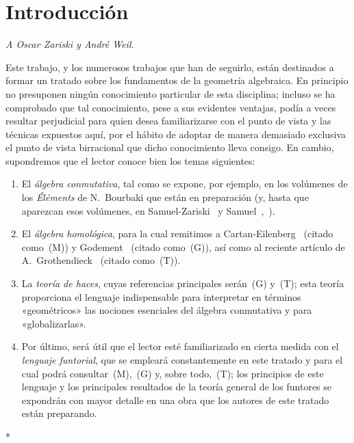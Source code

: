 \section*{Introducción}

\begin{center}
\emph{A Oscar Zariski y André Weil.}
\end{center}


Este trabajo, y los numerosos trabajos que han de seguirlo, están destinados a formar un tratado sobre los fundamentos de la geometría algebraica.
En principio no presuponen ningún conocimiento particular de esta disciplina; incluso se ha comprobado que tal conocimiento, pese a sus evidentes ventajas, podía a veces resultar perjudicial para quien desea familiarizarse con el punto de vista y las técnicas expuestos aquí, por el hábito de adoptar de manera demasiado exclusiva el punto de vista birracional que dicho conocimiento lleva consigo.
En cambio, supondremos que el lector conoce bien los temas siguientes:

\begin{enumerate}
  \item[a)] El \emph{álgebra conmutativa}, tal como se expone, por ejemplo, en los volúmenes de los \emph{Éléments} de N.~Bourbaki que están en preparación (y, hasta que aparezcan esos volúmenes, en Samuel-Zariski~\cite{I-13} y Samuel~\cite{I-11},~\cite{I-12}).
  \item[b)] El \emph{álgebra homológica}, para la cual remitimos a Cartan-Eilenberg~\cite{I-2} (citado como~(M)) y Godement~\cite{I-4} (citado como~(G)), así como al reciente artículo de A.~Grothendieck~\cite{I-6} (citado como~(T)).
  \item[c)] La \emph{teoría de haces}, cuyas referencias principales serán~(G) y~(T); esta teoría proporciona el lenguaje indispensable para interpretar en términos «geométricos» las nociones esenciales del álgebra conmutativa y para «globalizarlas».
  \item[d)] Por último, será útil que el lector esté familiarizado en cierta medida con el \emph{lenguaje funtorial}, que se empleará constantemente en este tratado y para el cual podrá consultar~(M),~(G) y, sobre todo,~(T); los principios de este lenguaje y los principales resultados de la teoría general de los funtores se expondrán con mayor detalle en una obra que los autores de este tratado están preparando.
\end{enumerate}

\bigskip
\begin{center}*\quad*\quad*\end{center}
\bigskip
